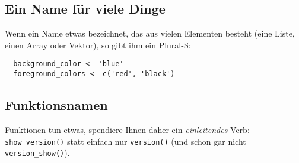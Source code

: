 \documentclass[twoside]{scrreprt}
\providecommand{\code}[1]{\texttt{#1}}
\begin{document}
\subsection{Ein Name f\"u{}r viele Dinge}
Wenn ein Name etwas bezeichnet, das aus vielen Elementen besteht (eine Liste,
einen Array oder Vektor), so gibt ihm ein Plural-S:
\begin{lstlisting}
  background_color <- 'blue'
  foreground_colors <- c('red', 'black')
\end{lstlisting}

\subsection{Funktionsnamen}
Funktionen tun etwas, spendiere Ihnen daher ein \emph{einleitendes} Verb:
\code{show\_version()} statt einfach nur \code{version()} (und schon gar nicht 
\code{version\_show()}).
\end{document}

